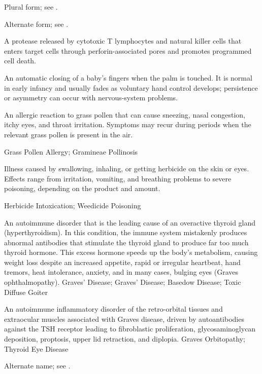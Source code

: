  Plural form; see .

 Alternate form; see .

 A protease released by cytotoxic T lymphocytes and natural killer cells that enters target cells through perforin-associated pores and promotes programmed cell death.

 An automatic closing of a baby’s fingers when the palm is touched. It is normal in early infancy and usually fades as voluntary hand control develops; persistence or asymmetry can occur with nervous-system problems.

 An allergic reaction to grass pollen that can cause sneezing, nasal congestion, itchy eyes, and throat irritation. Symptoms may recur during periods when the relevant grass pollen is present in the air.

\synonyms
Grass Pollen Allergy; Gramineae Pollinosis

 Illness caused by swallowing, inhaling, or getting herbicide on the skin or eyes. Effects range from irritation, vomiting, and breathing problems to severe poisoning, depending on the product and amount.

\synonyms
Herbicide Intoxication; Weedicide Poisoning

 An autoimmune disorder that is the leading cause of an overactive thyroid gland (hyperthyroidism). In this condition, the immune system mistakenly produces abnormal antibodies that stimulate the thyroid gland to produce far too much thyroid hormone. This excess hormone speeds up the body's metabolism, causing weight loss despite an increased appetite, rapid or irregular heartbeat, hand tremors, heat intolerance, anxiety, and in many cases, bulging eyes (Graves ophthalmopathy).
\synonyms
Graves' Disease; Graves’ Disease; Basedow Disease; Toxic Diffuse Goiter

 An autoimmune inflammatory disorder of the retro-orbital tissues and extraocular muscles associated with Graves disease, driven by autoantibodies against the TSH receptor leading to fibroblastic proliferation, glycosaminoglycan deposition, proptosis, upper lid retraction, and diplopia.
\synonyms
Graves Orbitopathy; Thyroid Eye Disease

 Alternate name; see .

